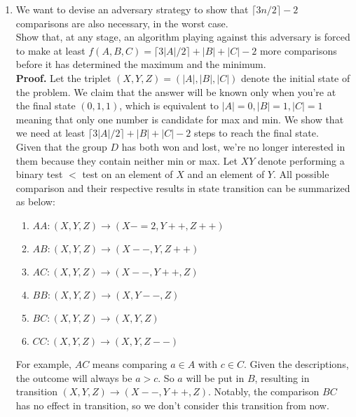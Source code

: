 \documentclass[letterpaper,12pt]{article}
\begin{document}
\begin{enumerate}
\begin{enumerate}
		\item We want to devise an adversary strategy to show that $\lceil 3n/2 \rceil - 2$ comparisons are also necessary, in the worst case.\\
Show that, at any stage, an algorithm playing against this adversary is forced to make at least $f(A,B,C) = \lceil 3|A|/2 \rceil+|B|+|C|-2$ more comparisons before it has determined the maximum and the minimum.\\
		\textbf{Proof.} Let the triplet $(X, Y, Z) = (|A|,|B|,|C|)$ denote the initial state of the problem. We claim that the answer will be known only when you're at the final state $(0, 1, 1)$, which is equivalent to $|A|=0, |B|=1, |C|=1$ meaning that only one number is candidate for max and min. We show that we need at least $\lceil 3|A|/2 \rceil+|B|+|C|-2$ steps to reach the final state.\\
	Given that the group $D$ has both won and lost, we're no longer interested in them because they contain neither min or max. Let $XY$ denote performing a binary test $<$ test on an element of $X$ and an element of $Y$. All possible comparison and their respective results in state transition can be summarized as below:
	\begin{enumerate}
		\item $AA : (X, Y, Z) \rightarrow (X-=2, Y++, Z++)$
		\item $AB : (X, Y, Z) \rightarrow (X--, Y, Z++)$
		\item $AC : (X, Y, Z) \rightarrow (X--, Y++, Z)$
		\item $BB : (X, Y, Z) \rightarrow (X, Y--, Z)$
		\item $BC : (X, Y, Z) \rightarrow (X, Y, Z)$
		\item $CC : (X, Y, Z) \rightarrow (X, Y, Z--)$
	\end{enumerate}
	For example, $AC$ means comparing $a\in A$ with $c\in C$. Given the descriptions, the outcome will always be $a>c$. So $a$ will be put in $B$, resulting in transition $(X, Y, Z) \rightarrow (X--, Y++, Z)$. Notably, the comparison $BC$ has no effect in transition, so we don't consider this transition from now.\\

\end{enumerate}
\end{enumerate}
\end{document}
